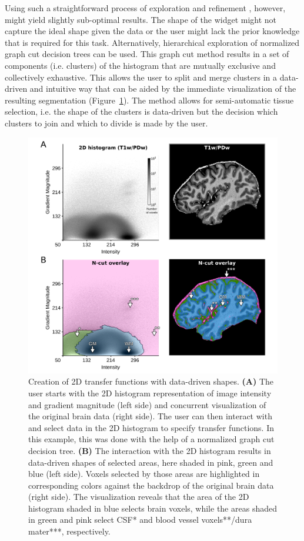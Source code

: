 Using such a straightforward process of exploration and refinement \parencite{Kniss2002}, however, might yield slightly sub-optimal results. The shape of the widget might not capture the ideal shape given the data or the user might lack the prior knowledge that is required for this task. Alternatively, hierarchical exploration of normalized graph cut decision trees \parencite{Ip2012} can be used. This graph cut method results in a set of components (i.e. clusters) of the histogram that are mutually exclusive and collectively exhaustive. This allows the user to split and merge clusters in a data-driven and intuitive way that can be aided by the immediate visualization of the resulting segmentation (Figure~\ref{fig:Fig3}). The method allows for semi-automatic tissue selection, i.e. the shape of the clusters is data-driven but the decision which clusters to join and which to divide is made by the user.

\begin{figure}[htb!]
\centering
\includegraphics[width=\textwidth]{figures/chapter_02/figure_3.png}
\caption{Creation of 2D transfer functions with data-driven shapes. \textbf{(A)} The user starts with the 2D histogram representation of image intensity and gradient magnitude (left side) and concurrent visualization of the original brain data (right side). The user can then interact with and select data in the 2D histogram to specify transfer functions. In this example, this was done with the help of a normalized graph cut decision tree. \textbf{(B)} The interaction with the 2D histogram results in data-driven shapes of selected areas, here shaded in pink, green and blue (left side). Voxels selected by those areas are highlighted in corresponding colors against the backdrop of the original brain data (right side). The visualization reveals that the area of the 2D histogram shaded in blue selects brain voxels, while the areas shaded in green and pink select CSF* and blood vessel voxels**/dura mater***, respectively.}
\label{fig:Fig3}
\end{figure}

